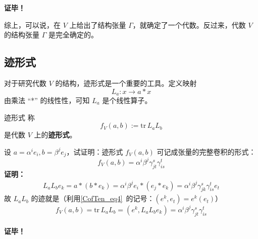\textbf{证毕！}

综上，可以说，在 $V$ 上给出了结构张量 $\Gamma$，就确定了一个代数。反过来，代数 $V$ 的结构张量 $\Gamma$ 是完全确定的。
\subsection{迹形式}
对于研究代数 $V$ 的结构，迹形式是一个重要的工具。定义映射
\begin{equation}
L_a:x\rightarrow a*x
\end{equation}
由乘法 “*” 的线性性，可知 $L_a$ 是个线性算子。
\begin{definition}{迹形式}
称
\begin{equation}
f_V(a,b):=\mathrm{tr}\, L_aL_b
\end{equation}
是代数 $V$ 上的\textbf{迹形式}。
\end{definition}
\begin{example}{}\label{STAlg_ex1}
设 $a=\alpha^i e_i,b=\beta^j e_j$，试证明：迹形式 $f_V(a,b)$ 可记成张量的完整卷积的形式：
\begin{equation}
f_V(a,b)=\alpha^i\beta^j\gamma_{jt}^s\gamma_{is}^t
\end{equation}
\textbf{证明：}
\begin{equation}
\begin{aligned}
L_aL_b e_k=a*(b*e_k)=\alpha^i\beta^je_i*(e_j*e_k)=\alpha^i\beta^j\gamma_{jk}^s \gamma_{is}^t e_t
\end{aligned}
\end{equation}
故 $L_aL_b$ 的迹就是（利用\autoref{CofTen_eq4}~的记号：$(e^k,e_t)=e^k(e_t)$）
\begin{equation}
f_V(a,b)=\mathrm{tr}\, L_a L_b=(e^k,L_aL_b e_k)=\alpha^i\beta^j\gamma_{jt}^s \gamma_{is}^t
\end{equation}\\
\textbf{证毕！}
\end{example}

